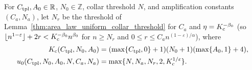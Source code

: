 \begin{definition}
    \label{def:peps_coarse_information_constants}
    \leanok
    For $C_{\rm tpl},A_0\in\mathbb R$, $N_0\in\mathbb Z$, collar threshold $N$, and amplification constants $(C_a,N_a)$, let $N_r$ be the threshold of Lemma~\ref{thm:area_law_uniform_collar_threshold} for $C_a$ and $\eta=K_{\rm c}^{-\beta_0}$ (so $\lfloor n^{1-\varepsilon}\rfloor+2r<K_{\rm c}^{-\beta_0}n^{\beta_0}$ for $n\ge N_r$ and $0\le r\le C_an^{(1-\varepsilon)/\alpha}$), where
    \begin{align}
        K_{\rm c}(C_{\rm tpl},N_0,A_0)     & =(\max\{C_{\rm tpl},0\}+1)(N_0+1)
        (\max\{A_0,1\}+4), \notag                                              \\
        u_0(C_{\rm tpl},N_0,A_0,N,C_a,N_a) & =
        \max\{N,N_a,N_r,2,K_{\rm c}^{1/\varepsilon}\}.
        \label{eq:peps_coarse_information_constants}
    \end{align}
\end{definition}

